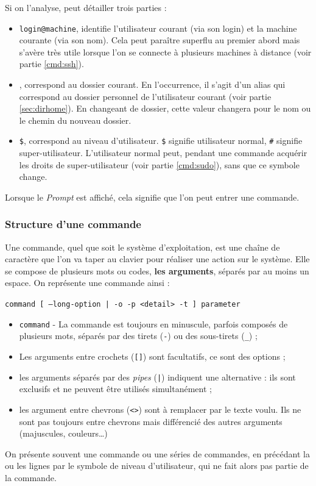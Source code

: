 Si on l'analyse, peut détailler trois parties :
\begin{itemize}
    \item \texttt{login@machine}, identifie l'utilisateur courant (via son login) et la machine courante (via son nom). Cela peut paraître superflu au premier abord mais s'avère très utile lorsque l'on se connecte à plusieurs machines à distance (voir partie \ref{cmd:ssh}).
    \item \texttt{\tilde}, correspond au dossier courant. En l'occurrence, il s'agit d'un alias qui correspond au dossier personnel de l'utilisateur courant (voir partie \ref{sec:dirhome}). En changeant de dossier, cette valeur changera pour le nom ou le chemin du nouveau dossier.
    \item \texttt{\$}, correspond au niveau d'utilisateur. \texttt{\$} signifie utilisateur normal, \texttt{\#} signifie super-utilisateur. L'utilisateur normal peut, pendant une commande acquérir les droits de super-utilisateur (voir partie \ref{cmd:sudo}), sans que ce symbole change.
\end{itemize}\vspace{1mm}

Lorsque le \textit{Prompt} est affiché, cela signifie que l'on peut entrer une commande.

\subsubsection{Structure d'une commande} \label{sec:command}

Une commande, quel que soit le système d'exploitation, est une chaîne de caractère que l'on va taper au clavier pour réaliser une action sur le système. Elle se compose de plusieurs mots ou codes, \textbf{les arguments}, séparés par au moins un espace. On représente une commande ainsi :
\begin{nscenter}
    \texttt{command [ --long-option | -o -p <detail> -t ] parameter}
\end{nscenter}
\begin{itemize}
    \item \texttt{command} - La commande est toujours en minuscule, parfois composés de plusieurs mots, séparés par des tirets (\texttt{-}) ou des sous-tirets (\texttt{\_}) ;
    \item Les arguments entre crochets (\texttt{[]}) sont facultatifs, ce sont des options ;
    \item les arguments séparés par des \textit{pipes} (\texttt{|}) indiquent une alternative : ils sont exclusifs et ne peuvent être utilisés simultanément ;
    \item les argument entre chevrons (\texttt{<>}) sont à remplacer par le texte voulu. Ils ne sont pas toujours entre chevrons mais différencié des autres arguments (majuscules, couleurs\dots)
\end{itemize}
 On présente souvent une commande ou une séries de commandes, en précédant la ou les lignes par le symbole de niveau d'utilisateur, qui ne fait alors pas partie de la commande.

